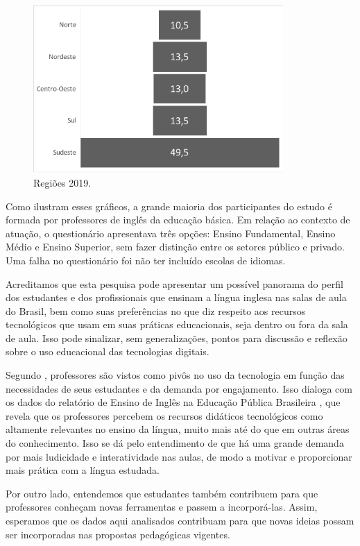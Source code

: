 \documentclass[portuguese]{textolivre}
\begin{document}
\begin{figure}[htbp]
 \centering
 \includegraphics[width=0.85\textwidth]{Figura6.pdf}
 \caption{Regiões 2019.}
 \label{Fig6}
\end{figure}

Como ilustram esses gráficos, a grande maioria dos participantes do estudo é formada por professores de inglês da educação básica. Em relação ao contexto de atuação, o questionário apresentava três opções: Ensino Fundamental, Ensino Médio e Ensino Superior, sem fazer distinção entre os setores público e privado. Uma falha no questionário foi não ter incluído escolas de idiomas.

Acreditamos que esta pesquisa pode apresentar um possível panorama do perfil dos estudantes e dos profissionais que ensinam a língua inglesa nas salas de aula do Brasil, bem como suas preferências no que diz respeito aos recursos tecnológicos que usam em suas práticas educacionais, seja dentro ou fora da sala de aula. Isso pode sinalizar, sem generalizações, pontos para discussão e reflexão sobre o uso educacional das tecnologias digitais.

Segundo \textcite{asik_ict_2020}, professores são vistos como pivôs no uso da tecnologia em função das necessidades de seus estudantes e da demanda por engajamento. Isso dialoga com os dados do relatório de Ensino de Inglês na Educação Pública Brasileira \cite{british_council_o_2015}, que revela que os professores percebem os recursos didáticos tecnológicos como altamente relevantes no ensino da língua, muito mais até do que em outras áreas do conhecimento. Isso se dá pelo entendimento de que há uma grande demanda por mais ludicidade e interatividade nas aulas, de modo a motivar e proporcionar mais prática com a língua estudada.

Por outro lado, entendemos que estudantes também contribuem para que professores conheçam novas ferramentas e passem a incorporá-las. Assim, esperamos que os dados aqui analisados contribuam para que novas ideias possam ser incorporadas nas propostas pedagógicas vigentes.
\end{document}
